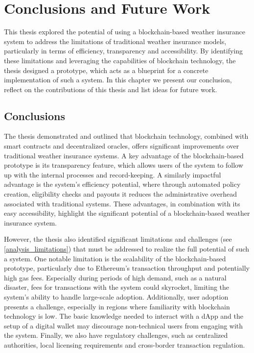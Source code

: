 \chapter{Conclusions and Future Work}\label{chapter:summary_conclusion}
This thesis explored the potential of using a blockchain-based weather insurance system to address the limitations of traditional weather insurance models, particularly in terms of efficiency, transparency and accessibility. By identifying these limitations and leveraging the capabilities of blockchain technology, the thesis designed a prototype, which acts as a blueprint for a concrete implementation of such a system. In this chapter we present our conclusion, reflect on the contributions of this thesis and list ideas for future work.

\section{Conclusions}\label{section:conclusions}
The thesis demonstrated and outlined that blockchain technology, combined with smart contracts and decentralized oracles, offers significant improvements over traditional weather insurance systems. A key advantage of the blockchain-based prototype is its transparency feature, which allows users of the system to follow up with the internal processes and record-keeping. A similarly impactful advantage is the system's efficiency potential, where through automated policy creation, eligibility checks and payouts it reduces the administrative overhead associated with traditional systems. These advantages, in combination with its easy accessibility, highlight the significant potential of a blockchain-based weather insurance system.

However, the thesis also identified significant limitations and challenges (see \cref{analysis_limitations}) that must be addressed to realize the full potential of such a system. One notable limitation is the scalability of the blockchain-based prototype, particularly due to Ethereum's transaction throughput and potentially high gas fees. Especially during periods of high demand, such as a natural disaster, fees for transactions with the system could skyrocket, limiting the system's ability to handle large-scale adoption. Additionally, user adoption presents a challenge, especially in regions where familiarity with blockchain technology is low. The basic knowledge needed to interact with a dApp and the setup of a digital wallet may discourage non-technical users from engaging with the system. Finally, we also have regulatory challenges, such as centralized authorities, local licensing requirements and cross-border transaction regulation.

